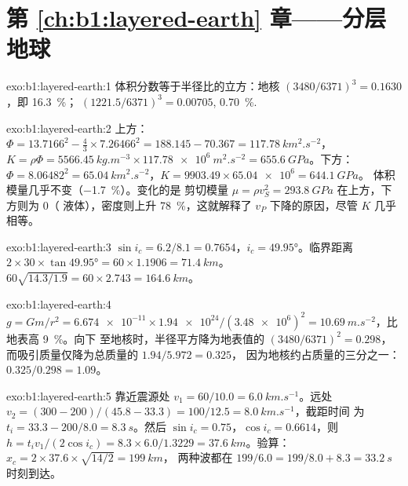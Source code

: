 \section*{第 \ref{ch:b1:layered-earth} 章——分层地球}

\begin{solution}{exo:b1:layered-earth:1}
体积分数等于半径比的立方：地核
$(3480/6371)^3 = 0.1630$，即 \qty{16.3}{\percent}；
$(1221.5/6371)^3 = 0.00705$, \qty{0.70}{\percent}.
\end{solution}

\begin{solution}{exo:b1:layered-earth:2}
上方：$\Phi = 13.7166^2 - \tfrac43\times7.26466^2 = 188.145 - 70.367 =
\qty{117.78}{km^2.s^{-2}}$，$K = \rho\Phi = \qty{5566.45}{kg.m^{-3}}\times
\qty{117.78e6}{m^2.s^{-2}} = \qty{655.6}{GPa}$。下方：$\Phi = 8.06482^2 =
\qty{65.04}{km^2.s^{-2}}$，$K = 9903.49\times\num{65.04e6} = \qty{644.1}{GPa}$。
体积模量几乎不变（\qty{-1.7}{\percent}）。变化的是
剪切模量 $\mu = \rho v_S^2 = \qty{293.8}{GPa}$ 在上方，下方则为 $0$（
液体），密度则上升 \qty{78}{\percent}，这就解释了
$v_P$ 下降的原因，尽管 $K$ 几乎相等。
\end{solution}

\begin{solution}{exo:b1:layered-earth:3}
$\sin i_c = 6.2/8.1 = 0.7654$，$i_c = \ang{49.95}$。临界距离
$2\times30\times\tan\ang{49.95} = 60\times1.1906 = \qty{71.4}{km}$。 $60\sqrt{14.3/1.9} = 60\times2.743 = \qty{164.6}{km}$。
\end{solution}

\begin{solution}{exo:b1:layered-earth:4}
$g = Gm/r^2 = \num{6.674e-11}\times\num{1.94e24}/(\num{3.48e6})^2 =
\qty{10.69}{m.s^{-2}}$，比地表高 \qty{9}{\percent}。向下
至地核时，半径平方降为地表值的 $(3480/6371)^2 = 0.298$，
而吸引质量仅降为总质量的 $1.94/5.972 = 0.325$，
因为地核约占质量的三分之一：$0.325/0.298 = 1.09$。
\end{solution}

\begin{solution}{exo:b1:layered-earth:5}
靠近震源处 $v_1 = 60/10.0 = \qty{6.0}{km.s^{-1}}$。远处
$v_2 = (300 - 200)/(45.8 - 33.3) = 100/12.5 = \qty{8.0}{km.s^{-1}}$，截距时间
为 $t_i = 33.3 - 200/8.0 = \qty{8.3}{s}$。然后 $\sin i_c =
0.75$，$\cos i_c = 0.6614$，则 $h = t_i v_1/(2\cos i_c) = 8.3\times6.0/1.3229
= \qty{37.6}{km}$。验算：$x_c = 2\times37.6\times\sqrt{14/2} = \qty{199}{km}$，
两种波都在 $199/6.0 = 199/8.0 + 8.3 = \qty{33.2}{s}$ 时刻到达。
\end{solution}

